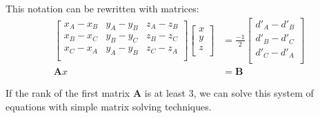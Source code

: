 \documentclass[preview,border=12pt]{standalone}
\begin{document}
This notation can be rewritten with matrices:
\begin{align*}
    \begin{bmatrix}
        x_A - x_B & y_A - y_B & z_A - z_B \\
        x_B - x_C & y_B - y_C & z_B - z_C \\
        x_C - x_A & y_A - y_B & z_C - z_A \\
    \end{bmatrix}
    \begin{bmatrix}
        x \\
        y \\
        z \\
    \end{bmatrix}
                 & =
    \frac{-1}{2}
    \begin{bmatrix}
        d'_A - d'_B \\
        d'_B - d'_C \\
        d'_C - d'_A \\
    \end{bmatrix}  \\
    \mathbf{A} x & = \mathbf{B}
\end{align*}

If the rank of the first matrix \(\mathbf{A}\) is at least 3, we can solve this system of equations with simple matrix solving techniques.

\end{document}
